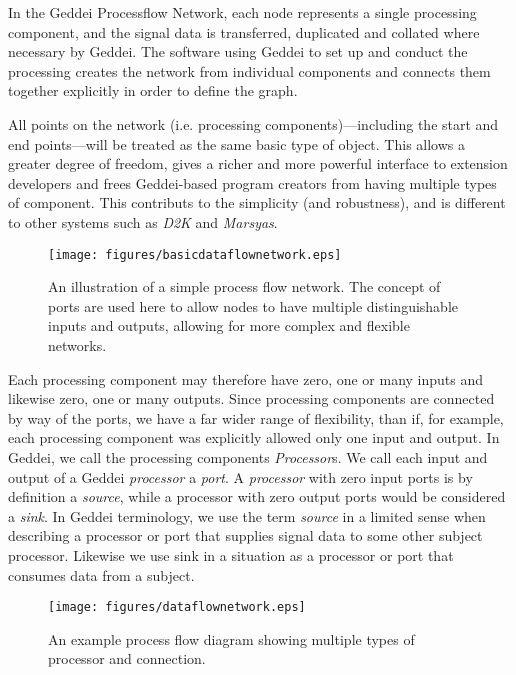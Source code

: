 In the Geddei Processflow Network, each node represents a single processing component, and the signal data is transferred, duplicated and collated where necessary by Geddei. The software using Geddei to set up and conduct the processing creates the network from individual components and connects them together explicitly in order to define the graph.

All points on the network (i.e. processing components)---including the start and end points---will be treated as the same basic type of object. This allows a greater degree of freedom, gives a richer and more powerful interface to extension developers and frees Geddei-based program creators from having multiple types of component. This contributs to the simplicity (and robustness), and is different to other systems such as \textit{D2K} and \textit{Marsyas}.

\begin{figure}[ht!]
\centering
\texttt{[image: figures/basicdataflownetwork.eps]}
\caption{An illustration of a simple process flow network. The concept of ports are used here to allow nodes to have multiple distinguishable inputs and outputs, allowing for more complex and flexible networks.}
\label{fig:basicdataflownetwork}
\end{figure}

Each processing component may therefore have zero, one or many inputs and likewise zero, one or many outputs. Since processing components are connected by way of the ports, we have a far wider range of flexibility, than if, for example, each processing component was explicitly allowed only one input and output. In Geddei, we call the processing components \textit{Processor}s. We call each input and output of a Geddei \textit{processor} a \textit{port}. A \textit{processor} with zero input ports is by definition a \textit{source}, while a processor with zero output ports would be considered a \textit{sink}. In Geddei terminology, we use the term \textit{source} in a limited sense when describing a processor or port that supplies signal data to some other subject processor. Likewise we use sink in a situation as a processor or port that consumes data from a subject.

\begin{figure}[ht!]
\centering
\texttt{[image: figures/dataflownetwork.eps]}
\caption{An example process flow diagram showing multiple types of processor and connection.}
\label{fig:dataflownetwork}
\end{figure}

